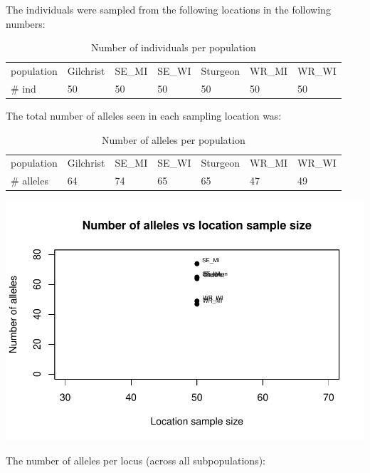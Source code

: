 \documentclass[a4paper]{scrartcl}\usepackage[]{graphicx}\usepackage[]{color}
\makeatletter
\def\maxwidth{ %
  \ifdim\Gin@nat@width>\linewidth
    \linewidth
  \else
    \Gin@nat@width
  \fi
}
\newenvironment{knitrout}{}{} %
\makeatother
\begin{document}
\noindent 
\newline The individuals were sampled from the following locations in the following numbers: 


\begin{table}[ht]
\centering
\begin{tabular}{lllllll}
   \hline
population & Gilchrist & SE\_MI & SE\_WI & Sturgeon & WR\_MI & WR\_WI \\ 
   \rowcolor[gray]{0.9} \# ind & 50 & 50 & 50 & 50 & 50 & 50 \\ 
   \hline
\end{tabular}
\caption{Number of individuals per population} 
\end{table}


\noindent
{} 
\newline The total number of alleles seen in each sampling location was:



\begin{table}[ht]
\centering
\begin{tabular}{lllllll}
   \hline
population & Gilchrist & SE\_MI & SE\_WI & Sturgeon & WR\_MI & WR\_WI \\ 
   \rowcolor[gray]{0.9} \# alleles & 64 & 74 & 65 & 65 & 47 & 49 \\ 
   \hline
\end{tabular}
\caption{Number of alleles per population} 
\end{table}

\begin{knitrout}
\color{fgcolor}
\includegraphics[width=\maxwidth]{PopGenReport_Hatchery-pop_sampsz_vs_alleles-1} 

\end{knitrout}
\FloatBarrier
\noindent
\newline The number of alleles per locus (across all subpopulations):
\end{document}
